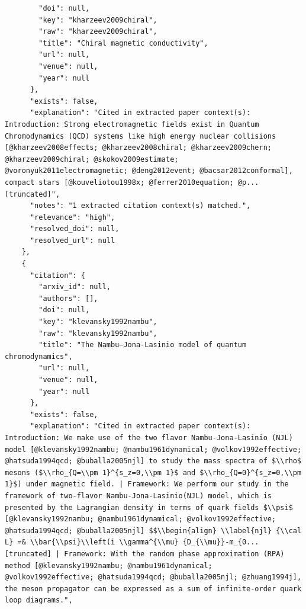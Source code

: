\documentclass[11pt]{article}
\begin{document}
\begin{verbatim}
        "doi": null,
        "key": "kharzeev2009chiral",
        "raw": "kharzeev2009chiral",
        "title": "Chiral magnetic conductivity",
        "url": null,
        "venue": null,
        "year": null
      },
      "exists": false,
      "explanation": "Cited in extracted paper context(s): Introduction: Strong electromagnetic fields exist in Quantum Chromodynamics (QCD) systems like high energy nuclear collisions [@kharzeev2008effects; @kharzeev2008chiral; @kharzeev2009chern; @kharzeev2009chiral; @skokov2009estimate; @voronyuk2011electromagnetic; @deng2012event; @bacsar2012conformal], compact stars [@kouveliotou1998x; @ferrer2010equation; @p... [truncated]",
      "notes": "1 extracted citation context(s) matched.",
      "relevance": "high",
      "resolved_doi": null,
      "resolved_url": null
    },
    {
      "citation": {
        "arxiv_id": null,
        "authors": [],
        "doi": null,
        "key": "klevansky1992nambu",
        "raw": "klevansky1992nambu",
        "title": "The Nambu—Jona-Lasinio model of quantum chromodynamics",
        "url": null,
        "venue": null,
        "year": null
      },
      "exists": false,
      "explanation": "Cited in extracted paper context(s): Introduction: We make use of the two flavor Nambu-Jona-Lasinio (NJL) model [@klevansky1992nambu; @nambu1961dynamical; @volkov1992effective; @hatsuda1994qcd; @buballa2005njl] to study the mass spectra of $\\rho$ mesons ($\\rho_{Q=\\pm 1}^{s_z=0,\\pm 1}$ and $\\rho_{Q=0}^{s_z=0,\\pm 1}$) under magnetic field. | Framework: We perform our study in the framework of two-flavor Nambu-Jona-Lasinio(NJL) model, which is presented by the Lagrangian density in terms of quark fields $\\psi$ [@klevansky1992nambu; @nambu1961dynamical; @volkov1992effective; @hatsuda1994qcd; @buballa2005njl] $$\\begin{align} \\label{njl} {\\cal L} =& \\bar{\\psi}\\left(i \\gamma^{\\mu} {D_{\\mu}}-m_{0... [truncated] | Framework: With the random phase approximation (RPA) method [@klevansky1992nambu; @nambu1961dynamical; @volkov1992effective; @hatsuda1994qcd; @buballa2005njl; @zhuang1994j], the meson propagator can be expressed as a sum of infinite-order quark loop diagrams.",

\end{verbatim}
\end{document}
